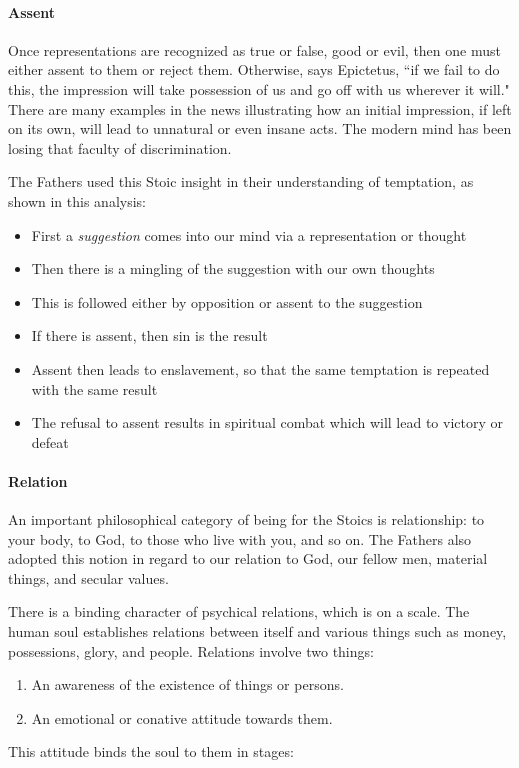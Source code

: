\paragraph{Assent}
Once representations are recognized as true or false, good or evil, then one must either assent to them or reject them. Otherwise, says Epictetus, ``if we fail to do this, the impression will take possession of us and go off with us wherever it will." There are many examples in the news illustrating how an initial impression, if left on its own, will lead to unnatural or even insane acts. The modern mind has been losing that faculty of discrimination.

The Fathers used this Stoic insight in their understanding of temptation, as shown in this analysis:

\begin{itemize}
\item First a \emph{suggestion} comes into our mind via a representation or thought 
\item Then there is a mingling of the suggestion with our own thoughts 
\item This is followed either by opposition or assent to the suggestion 
\item If there is assent, then sin is the result 
\item Assent then leads to enslavement, so that the same temptation is repeated with the same result 
\item The refusal to assent results in spiritual combat which will lead to victory or defeat 
\end{itemize}
\paragraph{Relation}
An important philosophical category of being for the Stoics is relationship: to your body, to God, to those who live with you, and so on. The Fathers also adopted this notion in regard to our relation to God, our fellow men, material things, and secular values.

There is a binding character of psychical relations, which is on a scale. The human soul establishes relations between itself and various things such as money, possessions, glory, and people. Relations involve two things:

\begin{enumerate}
\item An awareness of the existence of things or persons. 
\item An emotional or conative attitude towards them. 
\end{enumerate}
This attitude binds the soul to them in stages:

